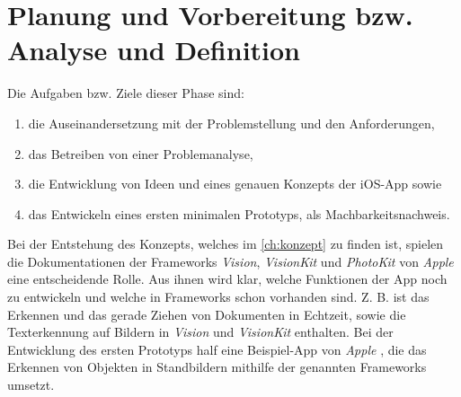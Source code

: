 \documentclass[notables, nomenclature, oneside, 150]{HSMW-Thesis}
\begin{document}
	\section{Planung und Vorbereitung bzw. Analyse und Definition}\label{sc:analyse}
		Die Aufgaben bzw. Ziele dieser Phase sind: \begin{enumerate}
			\item die Auseinandersetzung mit der Problemstellung und den Anforderungen,
			\item das Betreiben von einer Problemanalyse,
			\item die Entwicklung von Ideen und eines genauen Konzepts der iOS-App sowie 
			\item das Entwickeln eines ersten minimalen Prototyps, als Machbarkeitsnachweis.
		\end{enumerate}
		
		Bei der Entstehung des Konzepts, welches im \autoref{ch:konzept} zu finden ist, spielen die Dokumentationen der Frameworks \textit{Vision}, \textit{VisionKit} und \textit{PhotoKit} von \textit{Apple} eine entscheidende Rolle. Aus ihnen wird klar, welche Funktionen der App noch zu entwickeln und welche in Frameworks schon vorhanden sind. Z. B. ist das Erkennen und das gerade Ziehen von Dokumenten in Echtzeit, sowie die Texterkennung auf Bildern in \textit{Vision} und \textit{VisionKit} enthalten. Bei der Entwicklung des ersten Prototyps half eine Beispiel-App von \textit{Apple} \cite{apple_detecting_2019}, die das Erkennen von Objekten in Standbildern mithilfe der genannten Frameworks umsetzt.
		
\end{document}
